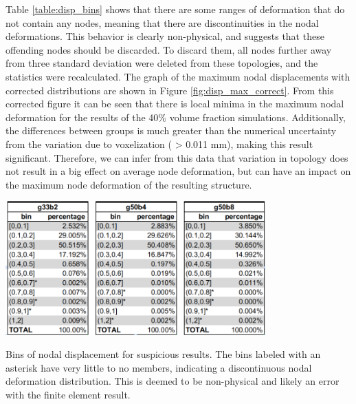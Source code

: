 \documentclass[../main.tex]{subfiles}
\begin{document}
Table \ref{table:disp_bins} shows that there are some ranges of deformation that do not contain any nodes, meaning that there are discontinuities in the nodal deformations. This behavior is clearly non-physical, and suggests that these offending nodes should be discarded. To discard them, all nodes further away from three standard deviation were deleted from these topologies, and the statistics were recalculated. The graph of the maximum nodal displacements with corrected distributions are shown in Figure \ref{fig:disp_max_correct}. From this corrected figure it can be seen that there is local minima in the maximum nodal deformation for the results of the 40\% volume fraction simulations. Additionally, the differences between groups is much greater than the numerical uncertainty from the variation due to voxelization ( > 0.011 mm), making this result significant. Therefore, we can infer from this data that variation in topology does not result in a big effect on average node deformation, but can have an impact on the maximum node deformation of the resulting structure. 

\begin{table}[h!]
  \centering
  \includegraphics[width=0.75\textwidth]{images/results/plots/femoral/displacement/bins.png}
  \caption{Bins of nodal displacement for suspicious results. The bins labeled with an asterisk have very little to no members, indicating a discontinuous nodal deformation distribution. This is deemed to be non-physical and likely an error with the finite element result.}
  \label{table:disp_bins}
\end{table}
\end{document}
